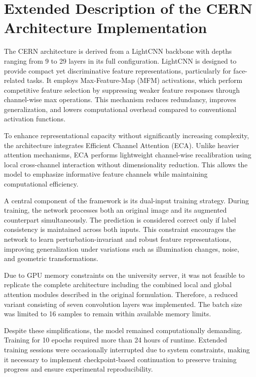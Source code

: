 \section{Extended Description of the CERN Architecture Implementation}
\label{sec:cern}


The CERN architecture is derived from a LightCNN backbone with depths ranging from 9 to 29 layers in its full configuration. LightCNN is designed to provide compact yet discriminative feature representations, particularly for face-related tasks. It employs Max-Feature-Map (MFM) activations, which perform competitive feature selection by suppressing weaker feature responses through channel-wise max operations. This mechanism reduces redundancy, improves generalization, and lowers computational overhead compared to conventional activation functions.

To enhance representational capacity without significantly increasing complexity, the architecture integrates Efficient Channel Attention (ECA). Unlike heavier attention mechanisms, ECA performs lightweight channel-wise recalibration using local cross-channel interaction without dimensionality reduction. This allows the model to emphasize informative feature channels while maintaining computational efficiency.

A central component of the framework is its dual-input training strategy. During training, the network processes both an original image and its augmented counterpart simultaneously. The prediction is considered correct only if label consistency is maintained across both inputs. This constraint encourages the network to learn perturbation-invariant and robust feature representations, improving generalization under variations such as illumination changes, noise, and geometric transformations.

Due to GPU memory constraints on the university server, it was not feasible to replicate the complete architecture including the combined local and global attention modules described in the original formulation. Therefore, a reduced variant consisting of seven convolution layers was implemented. The batch size was limited to 16 samples to remain within available memory limits.

Despite these simplifications, the model remained computationally demanding. Training for 10 epochs required more than 24 hours of runtime. Extended training sessions were occasionally interrupted due to system constraints, making it necessary to implement checkpoint-based continuation to preserve training progress and ensure experimental reproducibility.

